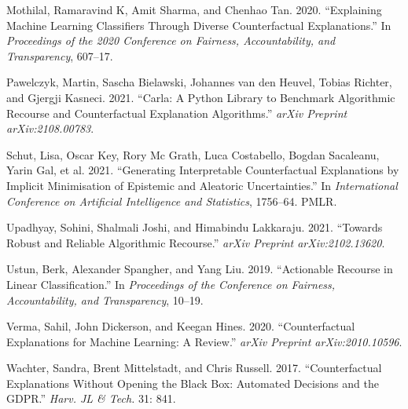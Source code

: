 \documentclass[
]{acmconf}
\newlength{\cslhangindent}
\newlength{\cslentryspacingunit} %
\newenvironment{CSLReferences}[2] %
 {%
  \setlength{\parindent}{0pt}
  \ifodd #1
  \let\oldpar\par
  \def\par{\hangindent=\cslhangindent\oldpar}
  \fi
  \setlength{\parskip}{#2\cslentryspacingunit}
 }%
 {}
\begin{document}
\begin{CSLReferences}{1}{0}
\leavevmode{}%
Mothilal, Ramaravind K, Amit Sharma, and Chenhao Tan. 2020.
{``Explaining Machine Learning Classifiers Through Diverse
Counterfactual Explanations.''} In \emph{Proceedings of the 2020
Conference on Fairness, Accountability, and Transparency}, 607--17.

\leavevmode{}%
Pawelczyk, Martin, Sascha Bielawski, Johannes van den Heuvel, Tobias
Richter, and Gjergji Kasneci. 2021. {``Carla: A Python Library to
Benchmark Algorithmic Recourse and Counterfactual Explanation
Algorithms.''} \emph{arXiv Preprint arXiv:2108.00783}.

\leavevmode{}%
Schut, Lisa, Oscar Key, Rory Mc Grath, Luca Costabello, Bogdan
Sacaleanu, Yarin Gal, et al. 2021. {``Generating Interpretable
Counterfactual Explanations by Implicit Minimisation of Epistemic and
Aleatoric Uncertainties.''} In \emph{International Conference on
Artificial Intelligence and Statistics}, 1756--64. PMLR.

\leavevmode{}%
Upadhyay, Sohini, Shalmali Joshi, and Himabindu Lakkaraju. 2021.
{``Towards Robust and Reliable Algorithmic Recourse.''} \emph{arXiv
Preprint arXiv:2102.13620}.

\leavevmode{}%
Ustun, Berk, Alexander Spangher, and Yang Liu. 2019. {``Actionable
Recourse in Linear Classification.''} In \emph{Proceedings of the
Conference on Fairness, Accountability, and Transparency}, 10--19.

\leavevmode{}%
Verma, Sahil, John Dickerson, and Keegan Hines. 2020. {``Counterfactual
Explanations for Machine Learning: A Review.''} \emph{arXiv Preprint
arXiv:2010.10596}.

\leavevmode{}%
Wachter, Sandra, Brent Mittelstadt, and Chris Russell. 2017.
{``Counterfactual Explanations Without Opening the Black Box: Automated
Decisions and the GDPR.''} \emph{Harv. JL \& Tech.} 31: 841.

\end{CSLReferences}
\end{document}
